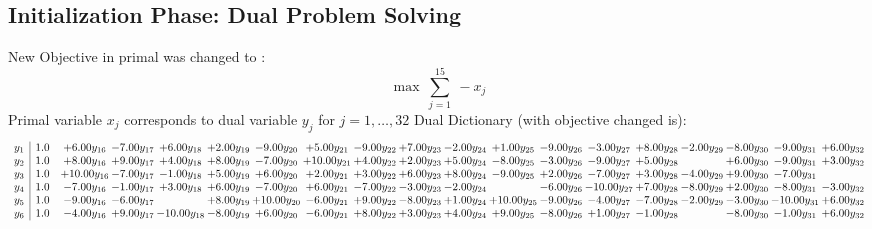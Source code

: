 \documentclass[9pt]{article}
\begin{document}
\subsection{Initialization Phase: Dual Problem Solving}
New Objective in primal was changed to : \[ \max\ \sum_{j=1}^{15}\ - x_j \] 
Primal variable $x_j$ corresponds to dual variable $y_j$ for $j = 1,\ldots,32$
Dual Dictionary (with objective changed is): 
\[\begin{array}{c| c c@{\hskip 2pt} c@{\hskip 2pt} c@{\hskip 2pt} c@{\hskip 2pt} c@{\hskip 2pt} c@{\hskip 2pt} c@{\hskip 2pt} c@{\hskip 2pt} c@{\hskip 2pt} c@{\hskip 2pt} c@{\hskip 2pt} c@{\hskip 2pt} c@{\hskip 2pt} c@{\hskip 2pt} c@{\hskip 2pt} c@{\hskip 2pt} c@{\hskip 2pt} }
 y_{1}   &  1.0 & +  6.00 y_{16} & -7.00 y_{17} & +  6.00 y_{18} & +  2.00 y_{19} & -9.00 y_{20} & +  5.00 y_{21} & -9.00 y_{22} & +  7.00 y_{23} & -2.00 y_{24} & +  1.00 y_{25} & -9.00 y_{26} & -3.00 y_{27} & +  8.00 y_{28} & -2.00 y_{29} & -8.00 y_{30} & -9.00 y_{31} & +  6.00 y_{32}\\
 y_{2}   &  1.0 & +  8.00 y_{16} & +  9.00 y_{17} & +  4.00 y_{18} & +  8.00 y_{19} & -7.00 y_{20} & + 10.00 y_{21} & +  4.00 y_{22} & +  2.00 y_{23} & +  5.00 y_{24} & -8.00 y_{25} & -3.00 y_{26} & -9.00 y_{27} & +  5.00 y_{28} &   & +  6.00 y_{30} & -9.00 y_{31} & +  3.00 y_{32}\\
 y_{3}   &  1.0 & + 10.00 y_{16} & -7.00 y_{17} & -1.00 y_{18} & +  5.00 y_{19} & +  6.00 y_{20} & +  2.00 y_{21} & +  3.00 y_{22} & +  6.00 y_{23} & +  8.00 y_{24} & -9.00 y_{25} & +  2.00 y_{26} & -7.00 y_{27} & +  3.00 y_{28} & -4.00 y_{29} & +  9.00 y_{30} & -7.00 y_{31} &   \\
 y_{4}   &  1.0 & -7.00 y_{16} & -1.00 y_{17} & +  3.00 y_{18} & +  6.00 y_{19} & -7.00 y_{20} & +  6.00 y_{21} & -7.00 y_{22} & -3.00 y_{23} & -2.00 y_{24} &   & -6.00 y_{26} & -10.00 y_{27} & +  7.00 y_{28} & -8.00 y_{29} & +  2.00 y_{30} & -8.00 y_{31} & -3.00 y_{32}\\
 y_{5}   &  1.0 & -9.00 y_{16} & -6.00 y_{17} &   & +  8.00 y_{19} & + 10.00 y_{20} & -6.00 y_{21} & +  9.00 y_{22} & -8.00 y_{23} & +  1.00 y_{24} & + 10.00 y_{25} & -9.00 y_{26} & -4.00 y_{27} & -7.00 y_{28} & -2.00 y_{29} & -3.00 y_{30} & -10.00 y_{31} & +  6.00 y_{32}\\
 y_{6}   &  1.0 & -4.00 y_{16} & +  9.00 y_{17} & -10.00 y_{18} & -8.00 y_{19} & +  6.00 y_{20} & -6.00 y_{21} & +  8.00 y_{22} & +  3.00 y_{23} & +  4.00 y_{24} & +  9.00 y_{25} & -8.00 y_{26} & +  1.00 y_{27} & -1.00 y_{28} &   & -8.00 y_{30} & -1.00 y_{31} & +  6.00 y_{32}\\

\end{array}\]
\end{document}
